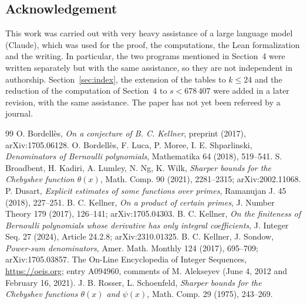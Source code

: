 \documentclass[11pt]{amsart}
\theoremstyle{remark}
\numberwithin{equation}{section}
\begin{document}
\subsection*{Acknowledgement}
This work was carried out with very heavy assistance of a large language model (Claude), which was used for the proof, the
computations, the Lean formalization and the writing. In particular, the two programs mentioned in Section~4 were written separately
but with the same assistance, so they are not independent in authorship. Section~\ref{sec:index}, the extension of the tables to
$k\le24$ and the reduction of the computation of Section~4 to $s<678\,407$ were added in a later revision, with the same assistance.
The paper has not yet been refereed by a journal.

\begin{thebibliography}{99}
 O. Bordell\`es, \emph{On a conjecture of B. C. Kellner}, preprint (2017), arXiv:1705.06128.
 O. Bordell\`es, F. Luca, P. Moree, I. E. Shparlinski, \emph{Denominators of Bernoulli polynomials}, Mathematika 64 (2018), 519--541.
 S. Broadbent, H. Kadiri, A. Lumley, N. Ng, K. Wilk, \emph{Sharper bounds for the Chebyshev function $\theta(x)$}, Math. Comp. 90 (2021), 2281--2315; arXiv:2002.11068.
 P. Dusart, \emph{Explicit estimates of some functions over primes}, Ramanujan J. 45 (2018), 227--251.
 B. C. Kellner, \emph{On a product of certain primes}, J. Number Theory 179 (2017), 126--141; arXiv:1705.04303.
 B. C. Kellner, \emph{On the finiteness of Bernoulli polynomials whose derivative has only integral coefficients}, J. Integer Seq. 27 (2024), Article 24.2.8; arXiv:2310.01325.
 B. C. Kellner, J. Sondow, \emph{Power-sum denominators}, Amer. Math. Monthly 124 (2017), 695--709; arXiv:1705.03857.
 The On-Line Encyclopedia of Integer Sequences, \url{https://oeis.org}; entry A094960, comments of M. Alekseyev (June 4, 2012 and February 16, 2021).
 J. B. Rosser, L. Schoenfeld, \emph{Sharper bounds for the Chebyshev functions $\theta(x)$ and $\psi(x)$}, Math. Comp. 29 (1975), 243--269.
\end{thebibliography}
\end{document}
